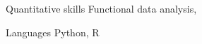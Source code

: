 
\begin{cvskills}
   \cvskill
    {Quantitative skills} %
    {Functional data analysis, } %
 
 
  \cvskill
    {Languages} %
    {Python, R} %


\end{cvskills}

